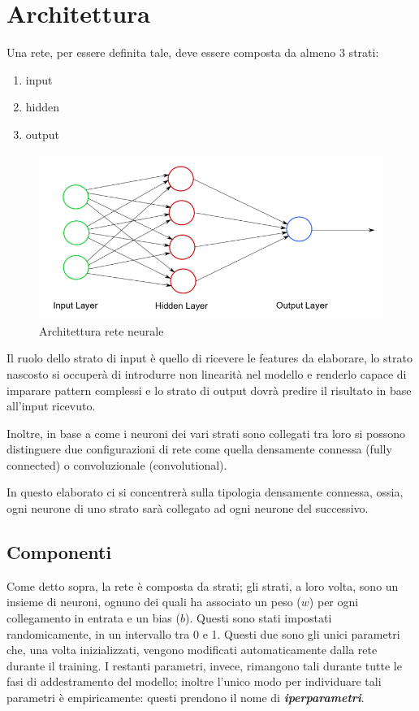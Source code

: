 \documentclass[12pt]{report}
\begin{document}
\section{Architettura}
Una rete, per essere definita tale, deve essere composta da almeno 3 strati:
\begin{enumerate}
\item{input}
\item{hidden}
\item{output}
\end{enumerate}

\begin{figure}
\includegraphics[scale=0.5]{nn_arch.png}
\caption{Architettura rete neurale}
\end{figure}

Il ruolo dello strato di input è quello di ricevere le features da elaborare, lo strato nascosto si occuperà di introdurre non linearità nel modello e renderlo capace di imparare pattern complessi e lo strato di output dovrà predire il risultato in base all’input ricevuto.

Inoltre, in base a come i neuroni dei vari strati sono collegati tra loro si possono distinguere due configurazioni di rete come quella densamente connessa (fully connected) o convoluzionale (convolutional).

In questo elaborato ci si concentrerà sulla tipologia densamente connessa, ossia, ogni neurone di uno strato sarà collegato ad ogni neurone del successivo.

\subsection{Componenti}
Come detto sopra, la rete è composta da strati; gli strati, a loro volta, sono un insieme di neuroni, ognuno dei quali ha associato un peso ($w$) per ogni collegamento in entrata e un bias ($b$). Questi sono stati impostati randomicamente, in un intervallo tra 0 e 1. Questi due sono gli unici parametri che, una volta inizializzati, vengono modificati automaticamente dalla rete durante il training. I restanti parametri, invece, rimangono tali durante tutte le fasi di addestramento del modello; inoltre l'unico modo per individuare tali parametri è empiricamente: questi prendono il nome di \textbf{\textit{iperparametri}}.
\end{document}
